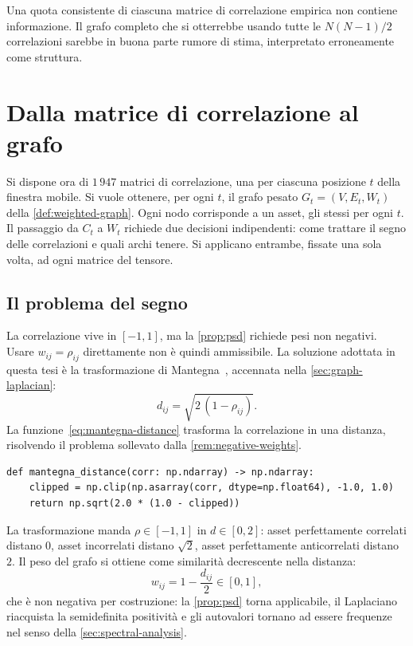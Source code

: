 Una quota consistente di ciascuna matrice di correlazione empirica non contiene informazione. Il grafo completo che si otterrebbe usando tutte le $N(N-1)/2$ correlazioni sarebbe in buona parte rumore di stima, interpretato erroneamente come struttura.

\section{Dalla matrice di correlazione al grafo}
\label{sec:correlation-matrix-to-graph}

Si dispone ora di $1\,947$ matrici di correlazione, una per ciascuna posizione $t$ della finestra mobile. Si vuole ottenere, per ogni $t$, il grafo pesato $G_t=(V,E_t,W_t)$ della \cref{def:weighted-graph}. Ogni nodo corrisponde a un asset, gli stessi per ogni $t$. Il passaggio da $C_t$ a $W_t$ richiede due decisioni indipendenti: come trattare il segno delle correlazioni e quali archi tenere. Si applicano entrambe, fissate una sola volta, ad ogni matrice del tensore.

\subsection{Il problema del segno}
\label{sec:sign-problem}

La correlazione vive in $[-1,1]$, ma la \cref{prop:psd} richiede pesi non negativi. Usare $w_{ij}=\rho_{ij}$ direttamente non è quindi ammissibile. La soluzione adottata in questa tesi è la trasformazione di Mantegna~\cite{mantegna1999hierarchical}, accennata nella \cref{sec:graph-laplacian}:
\begin{equation}
\label{eq:mantegna-distance}
d_{ij} = \sqrt{2\,(1-\rho_{ij})}.
\end{equation}
La funzione~\eqref{eq:mantegna-distance} trasforma la correlazione in una distanza, risolvendo il problema sollevato dalla \cref{rem:negative-weights}.

\begin{listing}[H]
\begin{verbatim}
def mantegna_distance(corr: np.ndarray) -> np.ndarray:
    clipped = np.clip(np.asarray(corr, dtype=np.float64), -1.0, 1.0)
    return np.sqrt(2.0 * (1.0 - clipped))
\end{verbatim}
\caption{\texttt{mantegna\_distance}}
\label{lst:mantegna-distance}
\end{listing}

La trasformazione manda $\rho\in[-1,1]$ in $d\in[0,2]$: asset perfettamente correlati distano $0$, asset incorrelati distano $\sqrt2$, asset perfettamente anticorrelati distano $2$. Il peso del grafo si ottiene come similarità decrescente nella distanza:
\begin{equation}
\label{eq:mantegna-weight}
w_{ij} = 1 - \frac{d_{ij}}{2} \in [0,1],
\end{equation}
che è non negativa per costruzione: la \cref{prop:psd} torna applicabile, il Laplaciano riacquista la semidefinita positività e gli autovalori tornano ad essere frequenze nel senso della \cref{sec:spectral-analysis}.

